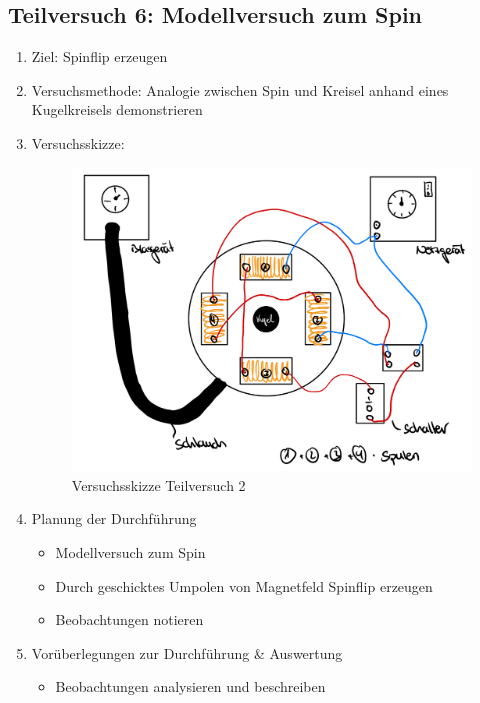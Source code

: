 \documentclass{article}
\begin{document}
\newpage

\subsection{Teilversuch 6: Modellversuch zum Spin}
\begin{enumerate}[label = (\Roman*)]
    \item Ziel: Spinflip erzeugen
    
    \item Versuchsmethode: Analogie zwischen Spin und Kreisel anhand eines Kugelkreisels demonstrieren
    
    \item Versuchsskizze:
    
        \begin{figure}[H]
        \centering
        \includegraphics[width=0.7\linewidth]{Abbildungen/TV6.jpeg}
        \caption{Versuchsskizze Teilversuch 2}
        \end{figure}

    \item Planung der Durchführung
        \begin{itemize}
           \item Modellversuch zum Spin
           \item Durch geschicktes Umpolen von Magnetfeld Spinflip erzeugen
           \item Beobachtungen notieren
        \end{itemize}

    \item Vorüberlegungen zur Durchführung \& Auswertung
        \begin{itemize}
            \item Beobachtungen analysieren und beschreiben
        \end{itemize}
        
\end{enumerate}
\end{document}

